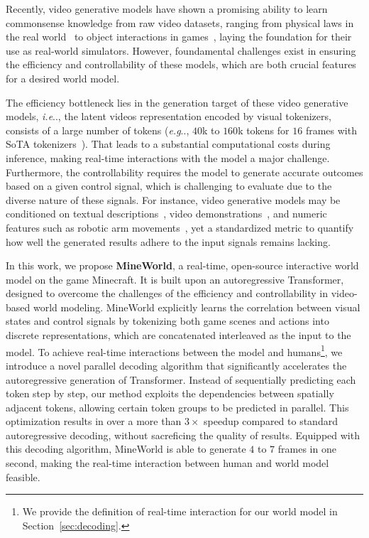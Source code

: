 \documentclass{article} %
\makeatletter
\DeclareRobustCommand\onedot{\futurelet\@let@token\@onedot}
\def\@onedot{\ifx\@let@token.\else.\null\fi\xspace}
\def\eg{\emph{e.g}\onedot} \def\Eg{\emph{E.g}\onedot}
\def\ie{\emph{i.e}\onedot} \def\Ie{\emph{I.e}\onedot}
\makeatother
\begin{document}
Recently, video generative models have shown a promising ability to learn commonsense knowledge from raw video datasets, ranging from physical laws in the real world~\citep{videoworldsimulators2024} to object interactions in games~\citep{parkerholder2024genie2,kanervisto2025world}, laying the foundation for their use as real-world simulators. 
However, foundamental challenges exist in ensuring the efficiency and controllability of these models, which are both crucial features for a desired world model. 

The efficiency bottleneck lies in the generation target of these video generative models, \ie, the latent videos representation encoded by visual tokenizers, consists of a large number of tokens (\eg, $40$k to $160$k tokens for $16$ frames with SoTA tokenizers~\citep{yang2024cogvideox,tang2024vidtok,wang2024vidtwin}). That leads to a substantial computational costs during inference, making real-time interactions with the model a major challenge.
Furthermore, the controllability requires the model to generate accurate outcomes based on a given control signal, which is challenging to evaluate due to the diverse nature of these signals. For instance, video generative models may be conditioned on textual descriptions~\citep{videoworldsimulators2024}, video demonstrations~\citep{zhang2025autoregressive}, and numeric features such as robotic arm movements~\citep{wu2024ivideogpt}, yet a standardized metric to quantify how well the generated results adhere to the input signals remains lacking.

In this work, we propose \textbf{MineWorld}, a real-time, open-source interactive world model on the game Minecraft. It is built upon an autoregressive Transformer, designed to overcome the challenges of the efficiency and controllability in video-based world modeling. MineWorld explicitly learns the correlation between visual states and control signals by tokenizing both game scenes and actions into discrete representations, which are concatenated interleaved as the input to the model.
To achieve real-time interactions between the model and humans\footnote{We provide the definition of real-time interaction for our world model in Section~\ref{sec:decoding}.}, we introduce a novel parallel decoding algorithm that significantly accelerates the autoregressive generation of Transformer. Instead of sequentially predicting each token step by step, our method exploits the dependencies between spatially adjacent tokens, allowing certain token groups to be predicted in parallel. This optimization results in over a more than $3\times$ speedup compared to standard autoregressive decoding, without sacreficing the quality of results. Equipped with this decoding algorithm, MineWorld is able to generate $4$ to $7$ frames in one second, making the real-time interaction between human and world model feasible.
\end{document}
